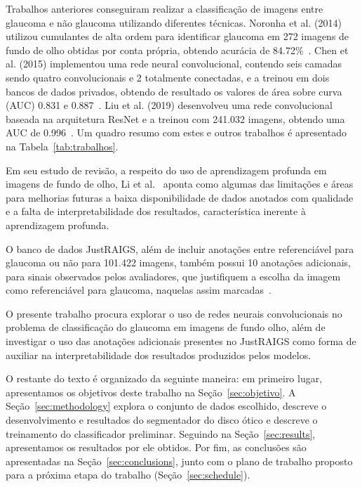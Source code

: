 \documentclass[12pt]{article}
\begin{document}
Trabalhos anteriores conseguiram realizar a classificação de imagens entre glaucoma e não glaucoma utilizando diferentes técnicas. Noronha et al. (2014) utilizou cumulantes de alta ordem para identificar glaucoma em 272 imagens de fundo de olho obtidas por conta própria, obtendo acurácia de 84.72\%~\cite{noronha2014hoc}. Chen et al. (2015) implementou uma rede neural convolucional, contendo seis camadas sendo quatro convolucionais e 2 totalmente conectadas, e a treinou em dois bancos de dados privados, obtendo de resultado os valores de área sobre curva (AUC) 0.831 e 0.887~\cite{chen2015cnn}. Liu et al. (2019) desenvolveu uma rede convolucional baseada na arquitetura ResNet e a treinou com 241.032 imagens, obtendo uma AUC de 0.996~\cite{liu_cnn_2019}. Um quadro resumo com estes e outros trabalhos é apresentado na Tabela~\ref{tab:trabalhos}.

Em seu estudo de revisão, a respeito do uso de aprendizagem profunda em imagens de fundo de olho, Li et al.~\cite{li_review_2021} aponta como algumas das limitações e áreas para melhorias futuras a baixa disponibilidade de dados anotados com qualidade e a falta de interpretabilidade dos resultados, característica inerente à aprendizagem profunda.

O banco de dados JustRAIGS, além de incluir anotações entre referenciável para glaucoma ou não para 101.422 imagens, também possui 10 anotações adicionais, para sinais observados pelos avaliadores, que justifiquem a escolha da imagem como referenciável para glaucoma, naquelas assim marcadas~\cite{justraigs_article}.

O presente trabalho procura explorar o uso de redes neurais convolucionais no problema de classificação do glaucoma em imagens de fundo olho, além de investigar o uso das anotações adicionais presentes no JustRAIGS como forma de auxiliar na interpretabilidade dos resultados produzidos pelos modelos.

O restante do texto é organizado da seguinte maneira: em primeiro lugar, apresentamos os objetivos deste trabalho na Seção~\ref{sec:objetivo}. A Seção~\ref{sec:methodology} explora o conjunto de dados escolhido, descreve o desenvolvimento e resultados do segmentador do disco ótico e descreve o treinamento do classificador preliminar. Seguindo na Seção~\ref{sec:results}, apresentamos os resultados por ele obtidos. Por fim, as conclusões são apresentadas na Seção~\ref{sec:conclusions}, junto com o plano de trabalho proposto para a próxima etapa do trabalho (Seção~\ref{sec:schedule}).
\end{document}
